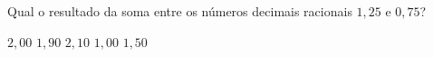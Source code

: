 Qual o resultado da soma entre os números decimais racionais $1{,}25$ e $0{,}75$?

$2{,}00$
$1{,}90$
$2{,}10$
$1{,}00$
$1{,}50$



